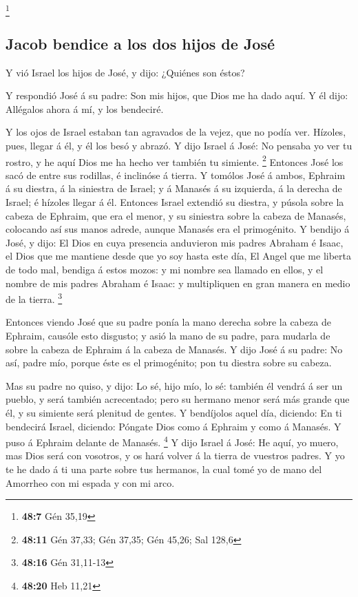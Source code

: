 \footnote{\textbf{48:7} Gén 35,19}

\hypertarget{jacob-bendice-a-los-dos-hijos-de-josuxe9}{%
\subsection{Jacob bendice a los dos hijos de
José}\label{jacob-bendice-a-los-dos-hijos-de-josuxe9}}

 Y vió Israel los hijos de José, y dijo: ¿Quiénes son éstos?

 Y respondió José á su padre: Son mis hijos, que Dios me ha
dado aquí. Y él dijo: Allégalos ahora á mí, y los bendeciré.

 Y los ojos de Israel estaban tan agravados de la vejez,
que no podía ver. Hízoles, pues, llegar á él, y él los besó y abrazó.
 Y dijo Israel á José: No pensaba yo ver tu rostro, y he
aquí Dios me ha hecho ver también tu simiente. \footnote{\textbf{48:11}
  Gén 37,33; Gén 37,35; Gén 45,26; Sal 128,6}  Entonces
José los sacó de entre sus rodillas, é inclinóse á tierra. 
Y tomólos José á ambos, Ephraim á su diestra, á la siniestra de Israel;
y á Manasés á su izquierda, á la derecha de Israel; é hízoles llegar á
él.  Entonces Israel extendió su diestra, y púsola sobre la
cabeza de Ephraim, que era el menor, y su siniestra sobre la cabeza de
Manasés, colocando así sus manos adrede, aunque Manasés era el
primogénito.  Y bendijo á José, y dijo: El Dios en cuya
presencia anduvieron mis padres Abraham é Isaac, el Dios que me mantiene
desde que yo soy hasta este día,  El Angel que me liberta
de todo mal, bendiga á estos mozos: y mi nombre sea llamado en ellos, y
el nombre de mis padres Abraham é Isaac: y multipliquen en gran manera
en medio de la tierra. \footnote{\textbf{48:16} Gén 31,11-13}

 Entonces viendo José que su padre ponía la mano derecha
sobre la cabeza de Ephraim, causóle esto disgusto; y asió la mano de su
padre, para mudarla de sobre la cabeza de Ephraim á la cabeza de
Manasés.  Y dijo José á su padre: No así, padre mío, porque
éste es el primogénito; pon tu diestra sobre su cabeza.

 Mas su padre no quiso, y dijo: Lo sé, hijo mío, lo sé:
también él vendrá á ser un pueblo, y será también acrecentado; pero su
hermano menor será más grande que él, y su simiente será plenitud de
gentes.  Y bendíjolos aquel día, diciendo: En ti bendecirá
Israel, diciendo: Póngate Dios como á Ephraim y como á Manasés. Y puso á
Ephraim delante de Manasés. \footnote{\textbf{48:20} Heb 11,21}
 Y dijo Israel á José: He aquí, yo muero, mas Dios será con
vosotros, y os hará volver á la tierra de vuestros padres. 
Y yo te he dado á ti una parte sobre tus hermanos, la cual tomé yo de
mano del Amorrheo con mi espada y con mi arco.

